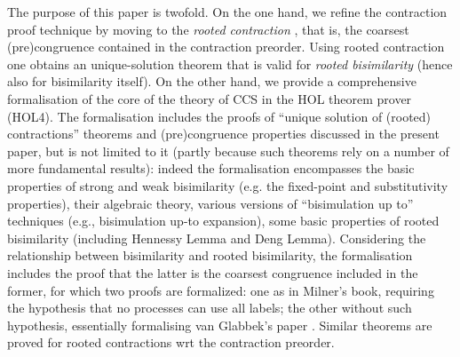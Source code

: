 The purpose of this paper is twofold. 
On the one hand, we refine the contraction proof technique by moving to the 
\emph{rooted contraction} \cite{Tian:2017wrba}, that is, the coarsest (pre)congruence contained in the contraction
preorder.  Using rooted contraction one obtains an unique-solution theorem that is valid for
\emph{rooted bisimilarity} (hence also for bisimilarity itself).  
On the other hand, we provide a  
 comprehensive formalisation  of the core of the theory of CCS 
 in the HOL
theorem prover (HOL4). The formalisation  includes the proofs of
``unique solution of (rooted) contractions'' theorems and
(pre)congruence properties discussed in the present paper, but is not limited to it (partly because such
theorems rely on a number of more fundamental results):
indeed the formalisation encompasses the basic properties of strong and weak
bisimilarity (e.g. the fixed-point and substitutivity properties), 
their algebraic theory, various versions of ``bisimulation up to''
techniques (e.g., bisimulation up-to expansion),
some basic properties of rooted bisimilarity (including Hennessy Lemma
and Deng Lemma).
Considering the relationship between bisimilarity and rooted
bisimilarity, the formalisation includes the proof that the latter is the coarsest
congruence included in the former, for which two proofs are formalized: one as in Milner's
book,  requiring the hypothesis that  no processes can use all labels; the other without
such hypothesis, essentially formalising van Glabbek's paper \cite{vanGlabbeek:2005ur}.
Similar theorems are proved for rooted contractions wrt the contraction preorder.

